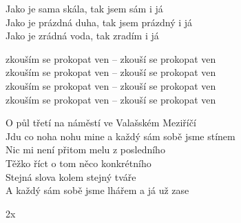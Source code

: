 
\ve{}
Jako je sama skála, tak jsem sám i já \\
Jako je prázdná duha, tak jsem prázdný i já \\
Jako je zrádná voda, tak zradím i já 

\cho{}
zkouším se prokopat ven -- zkouší se prokopat ven\\
zkouším se prokopat ven -- zkouší se prokopat ven\\
zkouším se prokopat ven -- zkouší se prokopat ven\\
zkouším se prokopat ven -- zkouší se prokopat ven

\ve{}
O půl třetí na náměstí ve Valašském Meziříčí\\
Jdu co noha nohu mine a každý sám sobě jsme stínem\\
Nic mi není přitom melu z posledního\\
Těžko říct o tom něco konkrétního\\
Stejná slova kolem stejný tváře\\
A každý sám sobě jsme lhářem a já už zase

\cho{} 2x

\esong{}